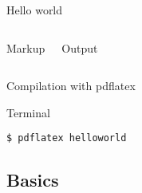 \documentclass[compress]{beamer}
\begin{document}
\begin{frame}[fragile]{Hello world}
    \begin{columns}[T]
            \begin{block}{Markup}
                
            \end{block}
            \begin{block}{Output}
                \setlength\fboxsep{0pt}
                \setlength\fboxrule{0.5pt}
                \begin{center}
                    \colorbox{white}{}
                \end{center}
            \end{block}
    \end{columns}
\end{frame}

\begin{frame}[fragile]{Compilation with pdflatex}

    \begin{block}{Terminal}
\begin{lstlisting}
$ pdflatex helloworld
\end{lstlisting}
    \end{block}

    \begin{block}{Makefile}
        make},
            showtabs=true
        ]{helloworld/makefile}
    \end{block}

\end{frame}

\subsection{Basics}
\end{document}
